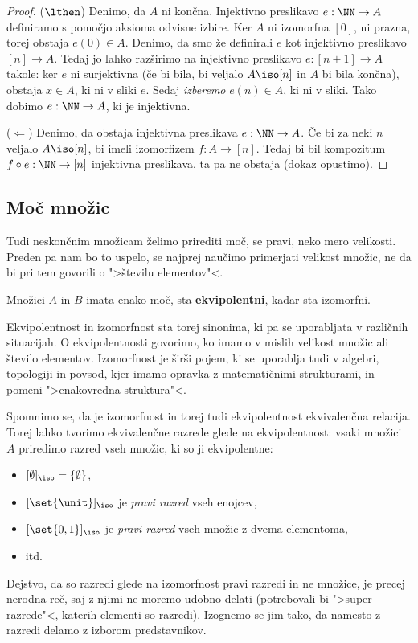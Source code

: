 \begin{proof}

($\lthen$)
%
Denimo, da $A$ ni končna.
Injektivno preslikavo $e : \NN \to A$ definiramo s pomočjo aksioma odvisne izbire.
Ker $A$ ni izomorfna $[0]$, ni prazna, torej obstaja $e(0) \in A$.
Denimo, da smo že definirali $e$ kot injektivno preslikavo $[n] \to A$.
Tedaj jo lahko razširimo na injektivno preslikavo $e : [n+1] \to A$ takole: ker $e$ ni surjektivna (če bi bila, bi veljalo $A \iso [n]$ in $A$ bi bila končna), obstaja $x \in A$, ki ni v sliki $e$.
Sedaj \emph{izberemo} $e(n) \in A$, ki ni v sliki.
Tako dobimo $e : \NN \to A$, ki je injektivna.

($\Leftarrow$)
%
Denimo, da obstaja injektivna preslikava $e : \NN \to A$.
Če bi za neki $n$ veljalo $A \iso [n]$, bi imeli izomorfizem $f : A \to [n]$.
Tedaj bi bil kompozitum $f \circ e : \NN \to [n]$ injektivna preslikava, ta pa ne obstaja (dokaz opustimo).
\end{proof}

\subsection{Moč množic}

Tudi neskončnim množicam želimo prirediti moč, se pravi, neko mero velikosti. Preden pa nam bo to uspelo, se najprej naučimo primerjati velikost množic, ne da bi pri tem govorili o ">številu elementov"<.

\begin{definicija}
  Množici $A$ in $B$ imata enako moč, sta \textbf{ekvipolentni}, kadar sta izomorfni.
\end{definicija}

Ekvipolentnost in izomorfnost sta torej sinonima, ki pa se uporabljata v različnih situacijah. O ekvipolentnosti govorimo, ko imamo v mislih velikost množic ali število elementov. Izomorfnost je širši pojem, ki se uporablja tudi v algebri, topologiji in povsod, kjer imamo opravka z matematičnimi strukturami, in pomeni ">enakovredna struktura"<.

Spomnimo se, da je izomorfnost in torej tudi ekvipolentnost ekvivalenčna relacija.
Torej lahko tvorimo ekvivalenčne razrede glede na ekvipolentnost: vsaki množici $A$ priredimo razred vseh množic, ki so ji ekvipolentne:
%
\begin{itemize}
\item $[\emptyset]_{\iso} = \{ \emptyset \}$,
\item $[\set{ \unit }]_{\iso}$ je \emph{pravi razred} vseh enojcev,
\item $[\set{0, 1}]_{\iso}$ je \emph{pravi razred} vseh množic z dvema elementoma,
\item itd.
\end{itemize}
%
Dejstvo, da so razredi glede na izomorfnost pravi razredi in ne množice, je precej nerodna reč, saj z njimi ne moremo udobno delati (potrebovali bi ">super razrede"<, katerih elementi so razredi).
Izognemo se jim tako, da namesto z razredi delamo z izborom predstavnikov.

